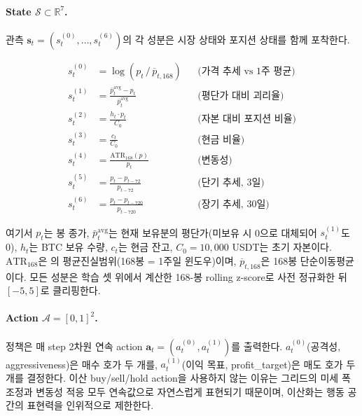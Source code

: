 \documentclass[11pt, a4paper]{article}
\begin{document}
\paragraph{State $\mathcal{S} \subset \mathbb{R}^7$.}
관측 $\mathbf{s}_t = (s_t^{(0)}, \ldots, s_t^{(6)})$의 각 성분은 시장 상태와 포지션
상태를 함께 포착한다.

\begin{align}
s_t^{(0)} &= \log\!\left(p_t \,\big/\, \overline{p}_{t, 168}\right) &&
\text{(가격 추세 vs 1주 평균)} \\
s_t^{(1)} &= \frac{\bar{p}^{\mathrm{avg}}_t - p_t}{\bar{p}^{\mathrm{avg}}_t} &&
\text{(평단가 대비 괴리율)} \\
s_t^{(2)} &= \frac{h_t \cdot p_t}{C_0} &&
\text{(자본 대비 포지션 비율)} \\
s_t^{(3)} &= \frac{c_t}{C_0} &&
\text{(현금 비율)} \\
s_t^{(4)} &= \frac{\mathrm{ATR}_{168}(p)}{p_t} &&
\text{(변동성)} \\
s_t^{(5)} &= \frac{p_t - p_{t-72}}{p_{t-72}} &&
\text{(단기 추세, 3일)} \\
s_t^{(6)} &= \frac{p_t - p_{t-720}}{p_{t-720}} &&
\text{(장기 추세, 30일)}
\end{align}

여기서 $p_t$는 봉 종가, $\bar{p}^{\mathrm{avg}}_t$는 현재 보유분의 평단가(미보유 시
0으로 대체되어 $s_t^{(1)}$도 0), $h_t$는 BTC 보유 수량, $c_t$는 현금 잔고,
$C_0=10{,}000$ USDT는 초기 자본이다. $\mathrm{ATR}_{168}$은
\citet{wilder1978atr}의 평균진실범위(168봉 = 1주일 윈도우)이며,
$\overline{p}_{t,168}$은 168봉 단순이동평균이다. 모든 성분은 학습 셋 위에서
계산한 168-봉 rolling z-score로 사전 정규화한 뒤 $[-5, 5]$로 클리핑한다.

\paragraph{Action $\mathcal{A} = [0,1]^2$.}
정책은 매 step 2차원 연속 action $\mathbf{a}_t = (a_t^{(0)}, a_t^{(1)})$를
출력한다. $a_t^{(0)}$(공격성, aggressiveness)은 매수 호가 두 개를, $a_t^{(1)}$(이익
목표, profit\_target)은 매도 호가 두 개를 결정한다. 이산 buy/sell/hold action을
사용하지 않는 이유는 그리드의 미세 폭 조정과 변동성 적응 모두 연속값으로 자연스럽게
표현되기 때문이며, 이산화는 행동 공간의 표현력을 인위적으로 제한한다.
\end{document}
